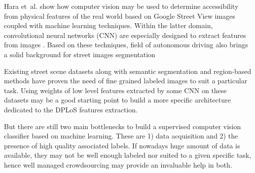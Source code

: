 \documentclass[10pt,conference,a4paper]{IEEEtran}
\begin{document}



Hara et~al. \cite{hara_tohme:_2014} show how computer vision may be used to determine accessibility from physical features of the real world based on Google Street View images coupled with machine learning techniques. Within the latter domain, convolutional neural networks (CNN) are especially designed to extract features from images \cite{lecun1995convolutional}. 
Based on these techniques, field of autonomous driving also brings a solid background for street images segmentation \cite{alvarez2012road} 



Existing street scene datasets %
along with semantic segmentation and region-based methods \cite{neuhold2017mapillary} have proven the need of fine grained labeled images to suit a particular task. Using weights of low level features extracted by some CNN on these datasets may be a good starting point to build a more specific architecture dedicated to the DPLoS features extraction.


But there are still two main bottlenecks to build a supervised computer vision classifier based on machine learning. These are 1) data acquisition and 2) the presence of high quality associated labels. If nowadays huge amount of data is available, they may not be well enough labeled nor suited to a given specific task, hence well managed crowdsourcing may provide an invaluable help in both.



\end{document}
